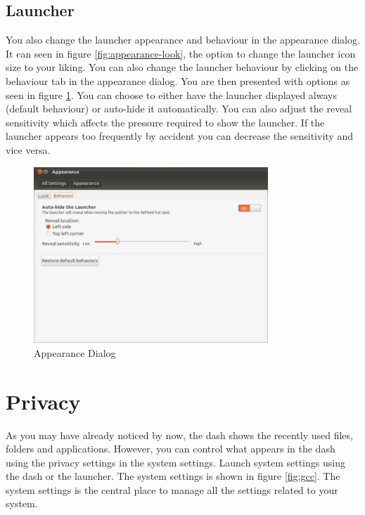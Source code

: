 \subsection*{Launcher} 
You also change the launcher appearance and behaviour in the appearance dialog. It can seen in figure \ref{fig:appearance-look}, the option to change the launcher icon size to your liking. You can also change the launcher behaviour by clicking on the behaviour tab in the appearance dialog. You are then presented with options as seen in figure \ref{fig:appearance-behavior}. You can choose to either have the launcher displayed always (default behaviour) or auto-hide it automatically. You can also adjust the reveal sensitivity which affects the pressure required to show the launcher. If the launcher appears too frequently by accident you can decrease the sensitivity and vice versa. 

\begin{figure}[h!]	
	\centering
	\includegraphics[width=250pt]{./images/customize-ubuntu/appearance-behavior.png}
	\caption{Appearance Dialog}	
	\label{fig:appearance-behavior}		
\end{figure}

\newpage
\section{Privacy} 
As you may have already noticed by now, the dash shows the recently used files, folders and applications. However, you can control what appears in the dash using the privacy settings in the system settings. Launch system settings using the dash or the launcher. The system settings is shown in figure \ref{fig:gcc}. The system settings is the central place to manage all the settings related to your system. \\

